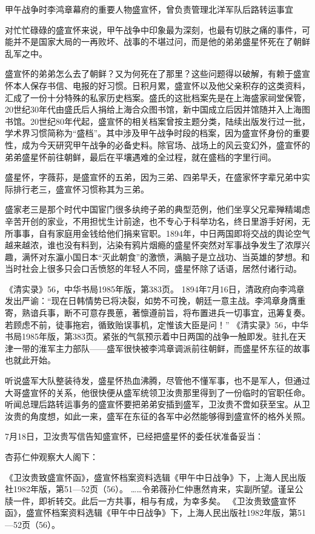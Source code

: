 \documentclass[12pt,UTF8]{ctexbook}
\begin{document}
甲午战争时李鸿章幕府的重要人物盛宣怀，曾负责管理北洋军队后路转运事宜

对忙忙碌碌的盛宣怀来说，甲午战争中印象最为深刻，也最有切肤之痛的事件，可能并不是国家大局的一再败坏、战事的不堪过问，而是他的弟弟盛星怀死在了朝鲜乱军之中。

盛宣怀的弟弟怎么去了朝鲜？又为何死在了那里？这些问题得以破解，有赖于盛宣怀本人保存书信、电报的好习惯。日积月累，盛宣怀以及他父亲积存的这类资料，汇成了一份十分特殊的私家历史档案。盛氏的这批档案先是在上海盛家祠堂保管，20世纪30年代由盛氏后人捐给上海合众图书馆，新中国成立后因并馆随并入上海图书馆。20世纪80年代起，盛宣怀的相关档案曾按主题分类，陆续出版发行过一批，学术界习惯简称为“盛档”。其中涉及甲午战争时段的档案，因为盛宣怀身份的重要性，成为今天研究甲午战争的必备史料。除官场、战场上的风云变幻外，盛宣怀的弟弟盛星怀前往朝鲜，最后在平壤遇难的全过程，就在盛档的字里行间。

盛星怀，字薇荪，是盛宣怀的五弟，因为三弟、四弟早夭，在盛家怀字辈兄弟中实际排行老三，盛宣怀习惯称其为三弟。

盛家老三是那个时代中国宦门很多纨绔子弟的典型范例，他们坐享父兄辈殚精竭虑辛苦开创的家业，不用担忧生计前途，也不专心于科举功名，终日里游手好闲，无所事事，自有家庭用金钱给他们捐来官职。1894年，中日两国即将交战的舆论空气越来越浓，谁也没有料到，沾染有鸦片烟瘾的盛星怀突然对军事战争发生了浓厚兴趣，满怀对东瀛小国日本“灭此朝食”的激愤，满脑子是立战功、当英雄的梦想。和当时社会上很多只会口舌愤怒的年轻人不同，盛星怀除了话语，居然付诸行动。

《清实录》56，中华书局1985年版，第383页。
1894年7月16日，清政府向李鸿章发出严谕：“现在日韩情势已将决裂，如势不可挽，朝廷一意主战。李鸿章身膺重寄，熟谙兵事，断不可意存畏葸，著懔遵前旨，将布置进兵一切事宜，迅筹复奏。若顾虑不前，徒事拖宕，循致贻误事机，定惟该大臣是问！” 《清实录》56，中华书局1985年版，第383页。紧张的气氛预示着中日两国的战争一触即发。驻扎在天津一带的淮军主力部队——盛军很快被李鸿章调派前往朝鲜，而盛星怀东征的故事也就此开始。

听说盛军大队整装待发，盛星怀热血沸腾，尽管他不懂军事，也不是军人，但通过大哥盛宣怀的关系，他很快便从盛军统领卫汝贵那里得到了一份临时的官职任命。听闻总理后路转运事务的盛宣怀要把弟弟安插到盛军，卫汝贵不啻如获至宝。从卫汝贵的角度想，如此一来，盛军在东征的各军中必然能够得到盛宣怀的格外关照。

7月18日，卫汝贵写信告知盛宣怀，已经把盛星怀的委任状准备妥当：

杏荪仁仲观察大人阁下：

《卫汝贵致盛宣怀函》，盛宣怀档案资料选辑《甲午中日战争》下，上海人民出版社1982年版，第51—52页（56）。
……令弟薇孙仁仲惠然肯来，实副所望。谨呈公牍一件，即祈转交。此后一方共事，相与有成，为幸多矣。 《卫汝贵致盛宣怀函》，盛宣怀档案资料选辑《甲午中日战争》下，上海人民出版社1982年版，第51—52页（56）。
\end{document}

